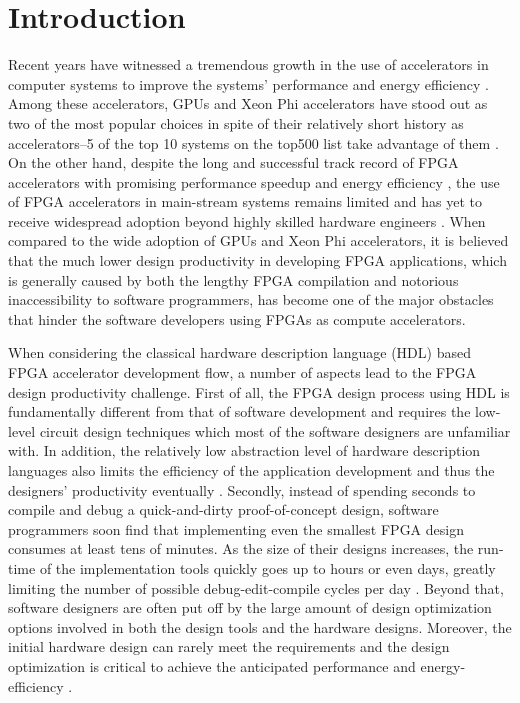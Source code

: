 \chapter{Introduction} \label{chapter:intro} 
Recent years have witnessed a tremendous growth in the use of accelerators in computer systems to improve the systems' performance and energy efficiency \cite{kim2014compression, majumder2014hardware, iouliia2004reconfigurable, souradip2010hardware, putnam2014reconfigurable}. Among these accelerators, GPUs and Xeon Phi accelerators have stood out as two of the most popular choices in spite of their relatively short history as accelerators--5 of the top 10 systems on the top500 list take advantage of them \cite{top500}. On the other hand, despite the long and successful track record of FPGA accelerators with promising performance speedup and energy efficiency \cite{iouliia2004reconfigurable, souradip2010hardware, asano2009performance, che2008accelerating, thomas2009comparison}, the use of FPGA accelerators in main-stream systems remains limited and has yet to receive widespread adoption beyond highly skilled hardware engineers \cite{cong2011high}. When compared to the wide adoption of GPUs and Xeon Phi accelerators, it is believed that the much lower design productivity in developing FPGA applications, which is generally caused by both the lengthy FPGA compilation and notorious inaccessibility to software programmers, has become one of the major obstacles that hinder the software developers using FPGAs as compute accelerators. 

When considering the classical hardware description language (HDL) based FPGA accelerator development flow, a number of aspects lead to the FPGA design productivity challenge. First of all, the FPGA design process using HDL is fundamentally different from that of software development and requires the low-level circuit design techniques which most of the software designers are unfamiliar with. In addition, the relatively low abstraction level of hardware description languages also limits the efficiency of the application development and thus the designers' productivity eventually \cite{cong2011high}. Secondly, instead of spending seconds to compile and debug a quick-and-dirty proof-of-concept design, software programmers soon find that implementing even the smallest FPGA design consumes at least tens of minutes. As the size of their designs increases, the run-time of the implementation tools quickly goes up to hours or even days, greatly limiting the number of possible debug-edit-compile cycles per day \cite{lavin2010using, lavin2011HMFlow, korf2011automatic, yue2015rapid}. Beyond that, software designers are often put off by the large amount of design optimization options involved in both the design tools and the hardware designs. Moreover, the initial hardware design can rarely meet the requirements and the design optimization is critical to achieve the anticipated performance and energy-efficiency \cite{schafer2012machine, zhong2014design, holzer2007design, schafer2012divide, liu2013learning, kurek2014automating}. 

